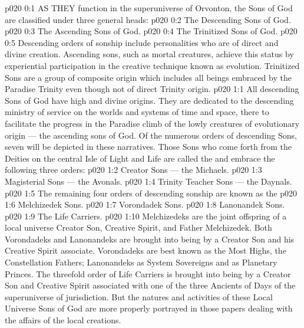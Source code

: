 \vs p020 0:1 AS THEY function in the superuniverse of Orvonton, the Sons of God are classified under three general heads:
\vs p020 0:2 \bibnobreakspace The Descending Sons of God.
\vs p020 0:3 \bibnobreakspace The Ascending Sons of God.
\vs p020 0:4 \bibnobreakspace The Trinitized Sons of God.
\vs p020 0:5 \pc Descending orders of sonship include personalities who are of direct and divine creation. Ascending sons, such as mortal creatures, achieve this status by experiential participation in the creative technique known as evolution. Trinitized Sons are a group of composite origin which includes all beings embraced by the Paradise Trinity even though not of direct Trinity origin.
\vs p020 1:1 All descending Sons of God have high and divine origins. They are dedicated to the descending ministry of service on the worlds and systems of time and space, there to facilitate the progress in the Paradise climb of the lowly creatures of evolutionary origin --- the ascending sons of God. Of the numerous orders of descending Sons, seven will be depicted in these narratives. Those Sons who come forth from the Deities on the central Isle of Light and Life are called the  and embrace the following three orders:
\vs p020 1:2 \bibnobreakspace Creator Sons --- the Michaels.
\vs p020 1:3 \bibnobreakspace Magisterial Sons --- the Avonals.
\vs p020 1:4 \bibnobreakspace Trinity Teacher Sons --- the Daynals.
\vs p020 1:5 \pc The remaining four orders of descending sonship are known as the 
\vs p020 1:6 \bibnobreakspace Melchizedek Sons.
\vs p020 1:7 \bibnobreakspace Vorondadek Sons.
\vs p020 1:8 \bibnobreakspace Lanonandek Sons.
\vs p020 1:9 \bibnobreakspace The Life Carriers.
\vs p020 1:10 \pc Melchizedeks are the joint offspring of a local universe Creator Son, Creative Spirit, and Father Melchizedek. Both Vorondadeks and Lanonandeks are brought into being by a Creator Son and his Creative Spirit associate. Vorondadeks are best known as the Most Highs, the Constellation Fathers; Lanonandeks as System Sovereigns and as Planetary Princes. The threefold order of Life Carriers is brought into being by a Creator Son and Creative Spirit associated with one of the three Ancients of Days of the superuniverse of jurisdiction. But the natures and activities of these Local Universe Sons of God are more properly portrayed in those papers dealing with the affairs of the local creations.
